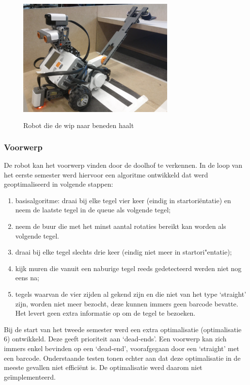 \documentclass[eind]{penoverslag}
\begin{document}
\begin{figure}[h]
	\centering
	\includegraphics[width=0.7\textwidth]{robotWip}
	\label{fig:robotWip}
	\caption{Robot die de wip naar beneden haalt}
\end{figure}


\subsubsection{Voorwerp} %
\label{sssec:AlgoZoek}
De robot kan het voorwerp vinden door de doolhof te verkennen. In de loop van het eerste semester werd hiervoor een algoritme ontwikkeld dat werd geoptimaliseerd in volgende stappen: 

\begin{enumerate}
\item basisalgoritme: draai bij elke tegel vier keer (eindig in startori\"entatie) en neem de laatste tegel in de queue als volgende tegel;
\item neem de buur die met het minst aantal rotaties bereikt kan worden als volgende tegel.
\item draai bij elke tegel slechts drie keer (eindig niet meer in startori"entatie);
\item kijk muren die vanuit een naburige tegel reeds gedetecteerd werden niet nog eens na;
\item tegels waarvan de vier zijden al gekend zijn en die niet van het type `straight' zijn, worden niet meer bezocht, deze kunnen immers geen barcode bevatte. Het levert geen extra informatie op om de tegel te bezoeken.
\end{enumerate}

Bij de start van het tweede semester werd een extra optimalisatie (optimalisatie 6) ontwikkeld. Deze geeft prioriteit aan `dead-ends'. Een voorwerp kan zich immers enkel bevinden op een `dead-end', voorafgegaan door een `straight' met een barcode. Onderstaande testen tonen echter aan dat deze optimalisatie in de meeste gevallen niet effici\"ent is. De optimalisatie werd daarom niet ge\"implementeerd.\\
\end{document}
